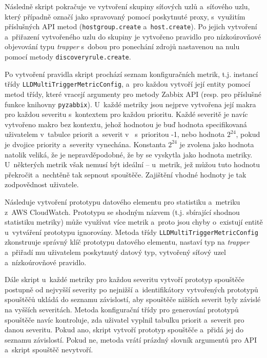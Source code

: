 \documentclass[czech, ing, kiv, he, iso690]{fasthesis}
\begin{document}
Následně skript pokračuje ve vytvoření skupiny síťových uzlů a~síťového uzlu, který případně označí jako spravovaný pomocí poskytnuté proxy, s~využitím příslušných API metod (\verb|hostgroup.create| a~\verb|host.create|). Po jejich vytvoření a~přiřazení vytvořeného uzlu do skupiny je vytvořeno pravidlo pro nízkoúrovňové objevování typu \emph{trapper} s~dobou pro ponechání zdrojů nastavenou na nulu pomocí metody \verb|discoveryrule.create|.

Po vytvoření pravidla skript prochází seznam konfiguračních metrik, t.j. instancí třídy \verb|LLDMultiTriggerMetricConfig|, a~pro každou vytvoří její entity pomocí metod třídy, které vracejí argumenty pro metody Zabbix API (resp. pro příslušné funkce knihovny \verb|pyzabbix|). U~každé metriky jsou nejprve vytvořena její makra pro každou severitu s~kontextem pro každou prioritu. Každé severitě je navíc vytvořeno makro bez kontextu, jehož hodnotou je buď hodnota specifikovaná uživatelem v~tabulce priorit a~severit v~ s~prioritou -1, nebo hodnota $2^{24}$, pokud je dvojice priority a~severity vynechána. Konstanta $2^{24}$ je zvolena jako hodnota natolik veliká, že je nepravděpodobné, že by se vyskytla jako hodnota metriky. U~některých metrik však nemusí být ideální -- u~metrik, jež můžou tuto hodnotu překročit a~nechtěně tak sepnout spouštěče. Zajištění vhodné hodnoty je tak zodpovědnost uživatele.

Následuje vytvoření prototypu datového elementu pro statistiku a~metriku z~AWS CloudWatch. Prototypu se shodným názvem (t.j. sbírající shodnou statistiku metriky) může využívat více metrik a~proto jsou chyby o~existují entitě u~vytváření prototypu ignorovány. Metoda třídy \verb|LLDMultiTriggerMetricConfig| zkonstruuje správný klíč prototypu datového elementu, nastaví typ na \emph{trapper} a~přiřadí mu uživatelem poskytnutý datový typ, vytvořený síťový uzel a~nízkoúrovňové pravidlo. 

Dále skript u~každé metriky pro každou severitu vytvoří prototyp spouštěče postupně od nejvyšší severity po nejnižší a~identifikátory vytvořených prototypů spouštěčů ukládá do seznamu závislostí, aby spouštěče nižších severit byly závislé na vyšších severitách. Metoda konfigurační třídy pro generování prototypů spouštěče navíc kontroluje, zda uživatel vyplnil tabulku priorit a~severit pro danou severitu. Pokud ano, skript vytvoří prototyp spouštěče a~přidá jej do seznamu závislostí. Pokud ne, metoda vrátí prázdný slovník argumentů pro API a~skript spouštěč nevytvoří.
\end{document}
